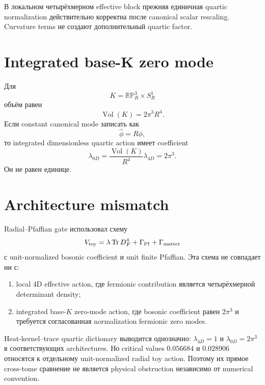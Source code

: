 \begin{proposition}
В локальном четырёхмерном effective block прежняя единичная quartic
normalization действительно корректна после canonical scalar rescaling.
Curvature terms не создают дополнительный quartic factor.
\end{proposition}

\section{Integrated base-K zero mode}

Для
\begin{equation}
 K=\mathbb{RP}^3_R\times S^1_R
\end{equation}
объём равен
\begin{equation}
 \operatorname{Vol}(K)=2\pi^3R^4.
\end{equation}
Если constant canonical mode записать как
\begin{equation}
 \widehat\phi=R\phi,
\end{equation}
то integrated dimensionless quartic action имеет coefficient
\begin{equation}
 \lambda_{0D}
 =\frac{\operatorname{Vol}(K)}{R^4}\lambda_{4D}
 =2\pi^3.
\end{equation}
Он не равен единице.

\section{Architecture mismatch}

Radial--Pfaffian gate использовал схему
\begin{equation}
 V_{\rm toy}
 =\lambda\operatorname{Tr} D_F^4+\Gamma_{\rm Pf}+\Gamma_{\rm matter}
\end{equation}
с unit-normalized bosonic coefficient и unit finite Pfaffian. Эта схема не
совпадает ни с:
\begin{enumerate}
\item local 4D effective action, где fermionic contribution является
четырёхмерной determinant density;
\item integrated base-\(K\) zero-mode action, где bosonic coefficient равен
$2\pi^3$ и требуется согласованная normalization fermionic zero modes.
\end{enumerate}

\begin{theorem}
Heat-kernel--trace quartic dictionary выводится однозначно:
$\lambda_{4D}=1$ и $\lambda_{0D}=2\pi^3$ в соответствующих architectures.
Но critical values $0.056684$ и $0.028906$ относятся к отдельному
unit-normalized radial toy action. Поэтому их прямое cross-tome сравнение не
является physical obstruction независимо от numerical convention.
\end{theorem}

